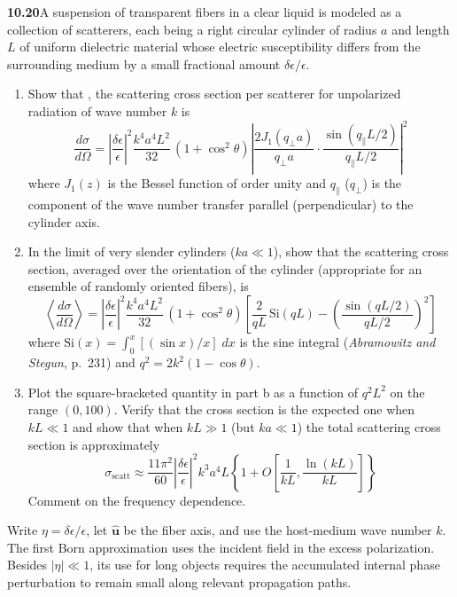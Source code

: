 \par\bigskip
\noindent\textbf{10.20}\quad A suspension of transparent fibers in a clear liquid is modeled as a collection of scatterers, each being a right circular cylinder of radius $a$ and length $L$ of uniform dielectric material whose electric susceptibility differs from the surrounding medium by a small fractional amount $\delta\epsilon/\epsilon$.
\begin{enumerate}
\item[(a)] Show that , the scattering cross section per scatterer for unpolarized radiation of wave number $k$ is
\[
\frac{d\sigma}{d\Omega}=\left|\frac{\delta\epsilon}{\epsilon}\right|^{2}\frac{k^{4}a^{4}L^{2}}{32}\,(1+\cos^{2}\theta)\!\left|\frac{2J_{1}(q_{\perp}a)}{q_{\perp}a}\cdot\frac{\sin(q_{\parallel}L/2)}{q_{\parallel}L/2}\right|^{2}
\]
where $J_{1}(z)$ is the Bessel function of order unity and $q_{\parallel}$ ($q_{\perp}$) is the component of the wave number transfer parallel (perpendicular) to the cylinder axis.
\item[(b)] In the limit of very slender cylinders ($ka\ll1$), show that the scattering cross section, averaged over the orientation of the cylinder (appropriate for an ensemble of randomly oriented fibers), is
\[
\left\langle\frac{d\sigma}{d\Omega}\right\rangle=\left|\frac{\delta\epsilon}{\epsilon}\right|^{2}\frac{k^{4}a^{4}L^{2}}{32}\,(1+\cos^{2}\theta)\!\left[\frac{2}{qL}\,\mathrm{Si}(qL)-\left(\frac{\sin(qL/2)}{qL/2}\right)^{2}\right]
\]
where $\mathrm{Si}(x)=\int_{0}^{x}[(\sin x)/x]\;dx$ is the sine integral (\emph{Abramowitz and Stegun}, p.~231) and $q^{2}=2k^{2}(1-\cos\theta)$.
\item[(c)] Plot the square-bracketed quantity in part b as a function of $q^{2}L^{2}$ on the range $(0,100)$. Verify that the cross section is the expected one when $kL\ll1$ and show that when $kL\gg1$ (but $ka\ll1$) the total scattering cross section is approximately
\[
\sigma_{\mathrm{scatt}}\approx\frac{11\pi^{2}}{60}\left|\frac{\delta\epsilon}{\epsilon}\right|^{2}k^{3}a^{4}L\!\left\{1+O\!\left[\frac{1}{kL},\frac{\ln(kL)}{kL}\right]\right\}
\]
Comment on the frequency dependence.
\end{enumerate}
\solution
Write $\eta=\delta\epsilon/\epsilon$, let $\widehat{\mathbf u}$ be the
fiber axis, and use the host-medium wave number $k$.
The first Born approximation uses the incident field in the excess
polarization. Besides $|\eta|\ll1$, its use for long objects requires
the accumulated internal phase perturbation to remain small along
relevant propagation paths.

